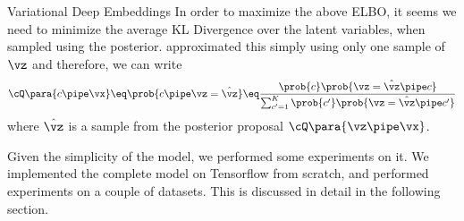 \documentclass{article}
\begin{document}
\begin{psection}{Variational Deep Embeddings}
	In order to maximize the above ELBO, it seems we need to minimize the average KL Divergence over the latent variables, when sampled using the posterior.  approximated this simply using only one sample of $\vz$ and therefore, we can write
	\begin{align*}
		\cQ\para{c \pipe \vx} \eq \prob{c \pipe \vz = \hat{\vz}} \eq \frac{\prob{c} \prob{\vz = \hat{\vz} \pipe c}}{\sum_{c' = 1}^{K} \prob{c'} \prob{\vz = \hat{\vz} \pipe c'}}
	\end{align*}
	where $\hat{\vz}$ is a sample from the posterior proposal $\cQ\para{\vz \pipe \vx}$.

	Given the simplicity of the model, we performed some experiments on it. We implemented the complete model on Tensorflow from scratch, and performed experiments on a couple of datasets. This is discussed in detail in the following section.
\end{psection}
\end{document}
